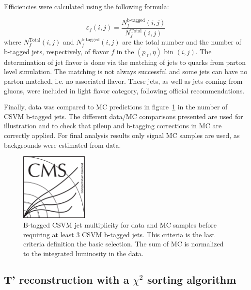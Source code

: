 Efficiencies were calculated using the following formula:

\begin{equation}
  \label{eq:btaggingeff}
  \varepsilon_f(i,j) = \frac{N_f^\text{b-tagged}(i,j)}{N_f^\text{Total}(i,j)}
\end{equation} where $ N_f^\text{Total}(i,j) $ and $ N_f^\text{b-tagged}(i,j) $ are the total number and the number of b-tagged jets, respectively, of flavor $ f $ in the $ (p_\text{T},\eta) $ bin $ (i,j) $. The determination of jet flavor is done via the matching of jets to quarks from parton level simulation. The matching is not always successful and some jets can have no parton matched, i.e. no associated flavor. These jets, as well as jets coming from gluons, were included in light flavor category, following official recommendations.

Finally, data was compared to MC predictions in figure~\ref{fig:Nb} in the number of CSVM b-tagged jets. The different data/MC comparisons presented are used for illustration and to check that pileup and b-tagging corrections in MC are correctly applied. For final analysis results only signal MC samples are used, as backgrounds were estimated from data.

\begin{figure}[!Hhtbp]
  \begin{center}
    \includegraphics[width=0.3\textwidth]{figs/CMSlogo.png}
    \caption{B-tagged CSVM jet multiplicity for data and MC samples before requiring at least 3 CSVM b-tagged jets. This criteria is the last criteria definition the basic selection. The sum of MC is normalized to the integrated luminosity in the data.}
    \label{fig:Nb}
  \end{center}
\end{figure}

\subsection{T' reconstruction with a $\chi^{2}$ sorting algorithm}
\label{sec:chi2}

